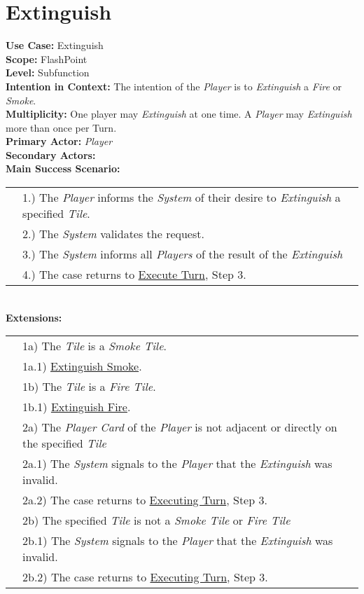 \documentclass{article}
\begin{document}
	\section*{Extinguish}
	\textbf{Use Case:} Extinguish\\
	\textbf{Scope:} FlashPoint\\
	\textbf{Level:} Subfunction\\
	\textbf{Intention in Context: } The intention of the \textit{Player} is to \textit{Extinguish} a \textit{Fire} or \textit{Smoke}. \\
	\textbf{Multiplicity: } One player may \textit{Extinguish} at one time. A \textit{Player} may \textit{Extinguish} more than once per Turn.\\
	\textbf{Primary Actor:} \textit{Player} \\
	\textbf{Secondary Actors:}\\
	\textbf{Main Success Scenario:}\\
	\begin{tabular}{l l}
		&1.) The \textit{Player} informs the \textit{System} of their desire to \textit{Extinguish} a specified \textit{Tile}.\\
		&2.) The \textit{System} validates the request. \\
		&3.) The \textit{System} informs all \textit{Players} of the result of the \textit{Extinguish}\\
		&4.) The case returns to \underline{Execute Turn}, Step 3.\\
	\end{tabular}\\
	\textbf{Extensions: }\\
	\begin{tabular}{l l}
		&1a) The \textit{Tile} is a \textit{Smoke Tile}.\\
		&\qquad1a.1) \underline{Extinguish Smoke}.\\
		&1b) The \textit{Tile} is a \textit{Fire Tile}. \\
		&\qquad1b.1) \underline{Extinguish Fire}.\\
		&2a) The \textit{Player Card} of the \textit{Player} is not adjacent or directly on the specified \textit{Tile} \\
		&\qquad2a.1) The \textit{System} signals to the \textit{Player} that the \textit{Extinguish} was invalid.\\ 
		&\qquad2a.2) The case returns to \underline{Executing Turn}, Step 3.\\
		&2b) The specified \textit{Tile} is not a \textit{Smoke Tile} or \textit{Fire Tile}\\
		&\qquad2b.1) The \textit{System} signals to the \textit{Player} that the \textit{Extinguish} was invalid.\\ 
		&\qquad2b.2) The case returns to \underline{Executing Turn}, Step 3.\\
	\end{tabular}
	
\end{document}
